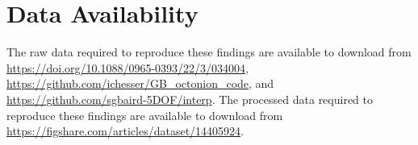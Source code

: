 \documentclass[final,twocolumn,12pt]{elsarticle}
\begin{document}
\begin{appendices}

\end{appendices}

\printglossaries

\section*{Data Availability}
The raw data required to reproduce these findings are available to download from \url{https://doi.org/10.1088/0965-0393/22/3/034004}, \url{https://github.com/ichesser/GB_octonion_code}, and \url{https://github.com/sgbaird-5DOF/interp}. The processed data required to reproduce these findings are available to download from \url{https://figshare.com/articles/dataset/14405924}.




% 
\end{document}
